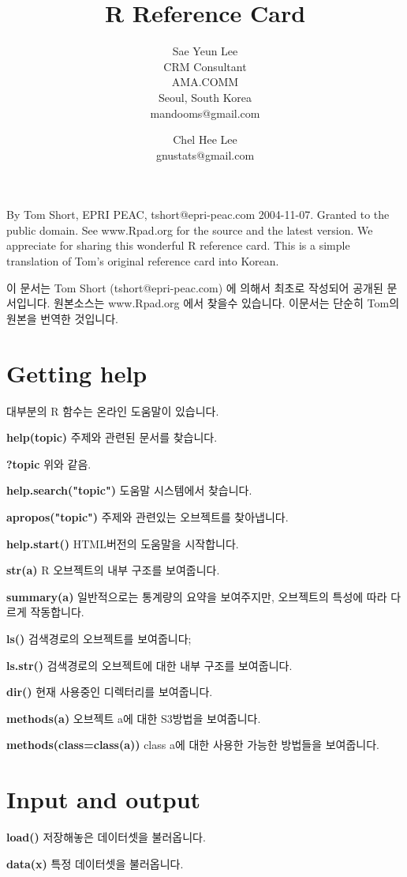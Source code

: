 \documentclass[landscape,twocolumn,letterpaper]{article}
\title{R Reference Card}
\author{Sae Yeun Lee \\ CRM Consultant \\ AMA.COMM \\ Seoul, South Korea \\
mandooms@gmail.com \and
Chel Hee Lee \\ gnustats@gmail.com }
\begin{document}
\maketitle

By Tom Short, EPRI PEAC, tshort@epri-peac.com 2004-11-07. Granted to the public
domain. See www.Rpad.org for the source and the latest version.
We appreciate for sharing this wonderful R reference card.
This is a simple translation of Tom's original reference card into Korean.

이 문서는 Tom Short (tshort@epri-peac.com) 에 의해서 최초로 작성되어 공개된 문서입니다.
원본소스는 www.Rpad.org 에서 찾을수 있습니다.
이문서는 단순히 Tom의 원본을 번역한 것입니다.

\section{Getting help}
대부분의 R 함수는 온라인 도움말이 있습니다.

\textbf{help(topic)} 주제와 관련된 문서를 찾습니다.

\textbf{?topic} 위와 같음.

\textbf{help.search("topic")} 도움말 시스템에서 찾습니다.

\textbf{apropos("topic")} 주제와 관련있는 오브젝트를 찾아냅니다.

\textbf{help.start()} HTML버전의 도움말을 시작합니다.

\textbf{str(a)} R 오브젝트의 내부 구조를 보여줍니다.

\textbf{summary(a)} 일반적으로는 통계량의 요약을 보여주지만, 오브젝트의 특성에 따라 다르게 작동합니다.

\textbf{ls()} 검색경로의 오브젝트를 보여줍니다;

\textbf{ls.str()} 검색경로의 오브젝트에 대한 내부 구조를 보여줍니다.

\textbf{dir()} 현재 사용중인 디렉터리를 보여줍니다.

\textbf{methods(a)} 오브젝트 a에 대한 S3방법을 보여줍니다.

\textbf{methods(class=class(a))} class a에 대한 사용한 가능한 방법들을 보여줍니다.


\section{Input and output}

\textbf{load()} 저장해놓은 데이터셋을 불러옵니다.

\textbf{data(x) }특정 데이터셋을 불러옵니다.
\end{document}
